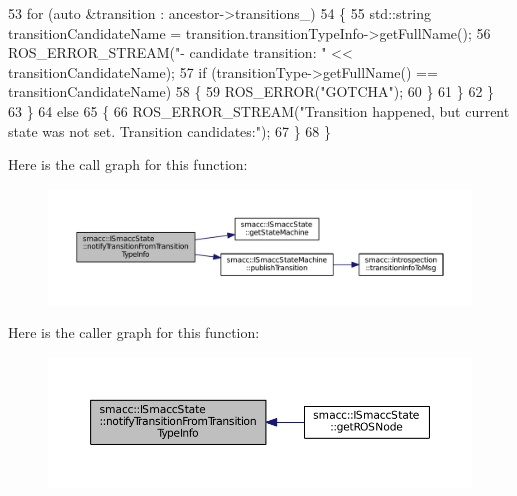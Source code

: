 \begin{DoxyCode}
53             \textcolor{keywordflow}{for} (\textcolor{keyword}{auto} &transition : ancestor->transitions\_)
54             \{
55                 std::string transitionCandidateName = transition.transitionTypeInfo->getFullName();
56                 ROS\_ERROR\_STREAM(\textcolor{stringliteral}{"- candidate transition: "} << transitionCandidateName);
57                 \textcolor{keywordflow}{if} (transitionType->getFullName() == transitionCandidateName)
58                 \{
59                     ROS\_ERROR(\textcolor{stringliteral}{"GOTCHA"});
60                 \}
61             \}
62         \}
63     \}
64     \textcolor{keywordflow}{else}
65     \{
66         ROS\_ERROR\_STREAM(\textcolor{stringliteral}{"Transition happened, but current state was not set. Transition candidates:"});
67     \}
68 \}
\end{DoxyCode}


Here is the call graph for this function\+:
\nopagebreak
\begin{figure}[H]
\begin{center}
\leavevmode
\includegraphics[width=350pt]{classsmacc_1_1ISmaccState_acb3dd7d402c634004ae3b67a01169438_cgraph}
\end{center}
\end{figure}




Here is the caller graph for this function\+:
\nopagebreak
\begin{figure}[H]
\begin{center}
\leavevmode
\includegraphics[width=350pt]{classsmacc_1_1ISmaccState_acb3dd7d402c634004ae3b67a01169438_icgraph}
\end{center}
\end{figure}


